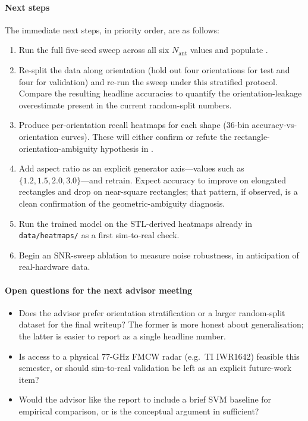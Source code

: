 \documentclass[letterpaper,11pt,leqno]{article}
\begin{document}
\paragraph{Next steps} The immediate next steps, in priority order, are as follows:
\begin{enumerate}
\item Run the full five-seed sweep across all six $N_{\mathrm{ant}}$ values and populate .
\item Re-split the data along orientation (hold out four orientations for test and four for validation) and re-run the sweep under this stratified protocol. Compare the resulting headline accuracies to quantify the orientation-leakage overestimate present in the current random-split numbers.
\item Produce per-orientation recall heatmaps for each shape (36-bin accuracy-vs-orientation curves). These will either confirm or refute the rectangle-orientation-ambiguity hypothesis in .
\item Add aspect ratio as an explicit generator axis---values such as $\{1.2, 1.5, 2.0, 3.0\}$---and retrain. Expect accuracy to improve on elongated rectangles and drop on near-square rectangles; that pattern, if observed, is a clean confirmation of the geometric-ambiguity diagnosis.
\item Run the trained model on the STL-derived heatmaps already in \texttt{data/heatmaps/} as a first sim-to-real check.
\item Begin an SNR-sweep ablation to measure noise robustness, in anticipation of real-hardware data.
\end{enumerate}

\paragraph{Open questions for the next advisor meeting}
\begin{itemize}
\item Does the advisor prefer orientation stratification or a larger random-split dataset for the final writeup? The former is more honest about generalisation; the latter is easier to report as a single headline number.
\item Is access to a physical 77-GHz FMCW radar (e.g.\ TI IWR1642) feasible this semester, or should sim-to-real validation be left as an explicit future-work item?
\item Would the advisor like the report to include a brief SVM baseline for empirical comparison, or is the conceptual argument in  sufficient?
\end{itemize}
\end{document}
